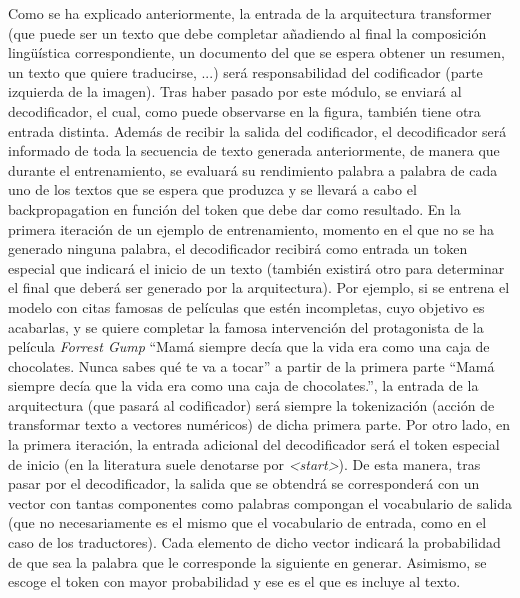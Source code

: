 Como se ha explicado anteriormente, la entrada de la arquitectura transformer (que puede ser un texto que debe completar añadiendo al final la composición lingüística correspondiente, un documento del que se espera obtener un resumen, un texto que quiere traducirse, ...) será responsabilidad del codificador (parte izquierda de la imagen). Tras haber pasado por este módulo, se enviará al decodificador, el cual, como puede observarse en la figura, también tiene otra entrada distinta. Además de recibir la salida del codificador, el decodificador será informado de toda la secuencia de texto generada anteriormente, de manera que durante el entrenamiento, se evaluará su rendimiento palabra a palabra de cada uno de los textos que se espera que produzca y se llevará a cabo el backpropagation en función del token que debe dar como resultado. En la primera iteración de un ejemplo de entrenamiento, momento en el que no se ha generado ninguna palabra, el decodificador recibirá como entrada un token especial que indicará el inicio de un texto (también existirá otro para determinar el final que deberá ser generado por la arquitectura). Por ejemplo, si se entrena el modelo con citas famosas de películas que estén incompletas, cuyo objetivo es acabarlas, y se quiere completar la famosa intervención del protagonista de la película \textit{Forrest Gump} ``Mamá siempre decía que la vida era como una caja de chocolates. Nunca sabes qué te va a tocar'' a partir de la primera parte ``Mamá siempre decía que la vida era como una caja de chocolates.'', la entrada de la arquitectura (que pasará al codificador) será siempre la tokenización (acción de transformar texto a vectores numéricos) de dicha primera parte. Por otro lado, en la primera iteración, la entrada adicional del decodificador será el token especial de inicio (en la literatura suele denotarse por \textit{<start>}). De esta manera, tras pasar por el decodificador, la salida que se obtendrá se corresponderá con un vector con tantas componentes como palabras compongan el vocabulario de salida (que no necesariamente es el mismo que el vocabulario de entrada, como en el caso de los traductores). Cada elemento de dicho vector indicará la probabilidad de que sea la palabra que le corresponde la siguiente en generar. Asimismo, se escoge el token con mayor probabilidad y ese es el que es incluye al texto. 

